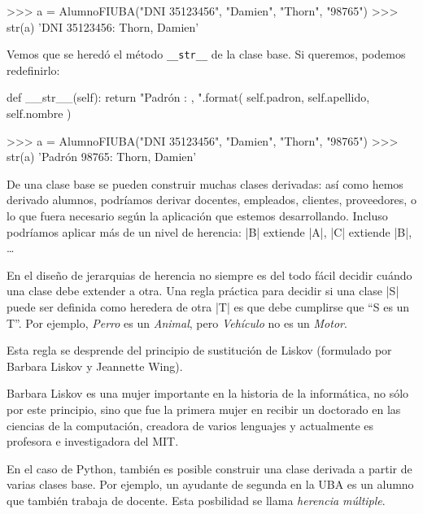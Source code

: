 \begin{codigo-python-sn}
>>> a = AlumnoFIUBA("DNI 35123456", "Damien", "Thorn", "98765")
>>> str(a)
'DNI 35123456: Thorn, Damien'
\end{codigo-python-sn}

Vemos que se heredó el método \lstinline+__str__+ de la clase base. Si
queremos, podemos redefinirlo:

\begin{codigo-python-sn}
    def __str__(self):
        return "Padrón {}: {}, {}".format(
            self.padron, self.apellido, self.nombre
        )
\end{codigo-python-sn}

\begin{codigo-python-sn}
>>> a = AlumnoFIUBA("DNI 35123456", "Damien", "Thorn", "98765")
>>> str(a)
'Padrón 98765: Thorn, Damien'
\end{codigo-python-sn}

De una clase base se pueden construir muchas clases derivadas: así como
hemos derivado alumnos, podríamos derivar docentes, empleados, clientes,
proveedores, o lo que fuera necesario según la aplicación que estemos
desarrollando. Incluso podríamos aplicar más de un nivel de herencia: |B|
extiende |A|, |C| extiende |B|, \ldots

\begin{sabias_que}
En el diseño de jerarquias de herencia no siempre es del todo fácil decidir
cuándo una clase debe extender a otra.
Una regla práctica para decidir si una clase |S| puede ser
definida como heredera de otra |T| es que debe cumplirse que ``S es un T''.
Por ejemplo, \emph{Perro} es un \emph{Animal}, pero \emph{Vehículo} no es un
\emph{Motor}.

Esta regla se desprende del principio de sustitución de Liskov (formulado por
Barbara Liskov y Jeannette Wing).

Barbara Liskov es una mujer importante en la historia de la informática, no
sólo por este principio, sino que fue la primera mujer en recibir un doctorado
en las ciencias de la computación, creadora de varios lenguajes y actualmente
es profesora e investigadora del MIT.
\end{sabias_que}

En el caso de Python, también es posible construir una clase derivada a partir
de varias clases base. Por ejemplo, un ayudante de segunda en la UBA es un
alumno que también trabaja de docente.  Esta posbilidad se llama \emph{herencia
múltiple}.

